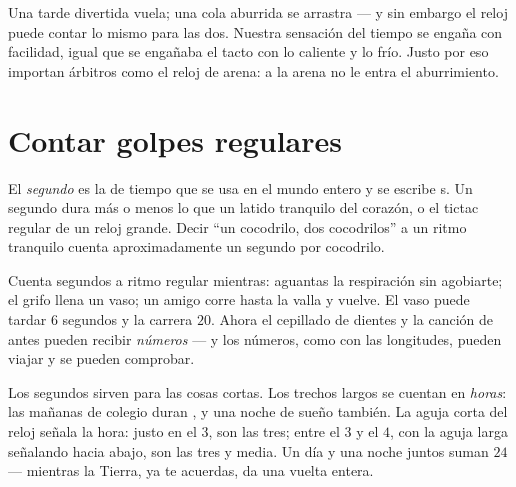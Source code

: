 \begin{remark}\label{rem:g2:measuring-time:feelings}
Una tarde divertida vuela; una cola aburrida se arrastra --- y sin
embargo el reloj puede contar lo mismo para las dos. Nuestra sensación
del tiempo se engaña con facilidad, igual que se engañaba el tacto con
lo caliente y lo frío. Justo por eso importan árbitros como el reloj
de arena: a la arena no le entra el aburrimiento.
\end{remark}

\section{Contar golpes regulares}

\begin{definition}[El segundo]\label{def:g2:measuring-time:second}
El \emph{segundo} es la  de tiempo que se usa en
el mundo entero y se escribe \unit{s}. Un segundo dura más o menos lo
que un latido tranquilo del corazón, o el tictac regular de un reloj
grande. Decir ``un cocodrilo, dos cocodrilos'' a un ritmo tranquilo
cuenta aproximadamente un segundo por cocodrilo.
\end{definition}

\begin{example}\label{ex:g2:measuring-time:count}
Cuenta segundos a ritmo regular mientras: aguantas la respiración sin
agobiarte; el grifo llena un vaso; un amigo corre hasta la valla y
vuelve. El vaso puede tardar $6$ segundos y la carrera $20$. Ahora el
cepillado de dientes y la canción de antes pueden recibir
\emph{números} --- y los números, como con las longitudes, pueden
viajar y se pueden comprobar.
\end{example}

\begin{example}\label{ex:g2:measuring-time:clock}
Los segundos sirven para las cosas cortas. Los trechos largos se
cuentan en \emph{horas}: las mañanas de colegio duran
, y una noche de sueño también. La aguja corta del reloj
señala la hora: justo en el $3$, son las tres; entre el $3$ y el $4$,
con la aguja larga señalando hacia abajo, son las tres y media. Un día
y una noche juntos suman $24$  --- mientras la Tierra, ya te
acuerdas, da una vuelta entera.
\end{example}

